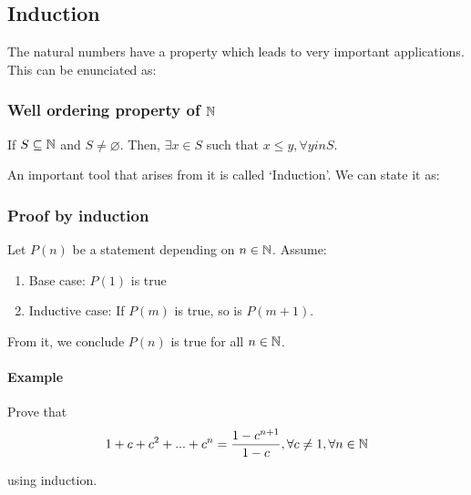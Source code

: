 \subsection{Induction}

The natural numbers have a property which leads to very important applications. This can be enunciated as:

\subsubsection{Well ordering property of $\mathbb{N}$}

If $S \subseteq \mathbb{N}$ and $S \neq \varnothing$. Then, $\exists x \in S$ such that $x \leq y, \forall y in S$.

An important tool that arises from it is called `Induction'. We can state it as:

\subsubsection{Proof by induction}

Let $P(n)$ be a statement depending on $n \in \mathbb{N}$. Assume:

\begin{enumerate}
    \item Base case: $P(1)$ is true
    \item Inductive case: If $P(m)$ is true, so is $P(m+1)$.
\end{enumerate}

From it, we conclude $P(n)$ is true for all $n \in \mathbb{N}$.

\paragraph{Example}

Prove that 
\begin{equation}
    1 + c + c^2 + ... + c^n = \frac{1-c^{n+1}}{1-c}, \forall c \neq 1, \forall n \in \mathbb{N}
\end{equation}

using induction.

